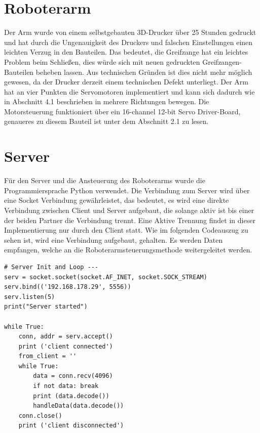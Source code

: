 \documentclass[12pt,					%
							 oneside,			%
							 a4paper,			%
							 halfparskip,		%
							 liststotoc,			%
							 bibtotoc,			%
							 fleqn,				%
							 pointlessnumbers]	%
							 {scrreprt}
\begin{document}
\section{Roboterarm}
Der Arm wurde von einem selbstgebauten 3D-Drucker über 25 Stunden gedruckt und hat durch die Ungenauigkeit des Druckers und falschen Einstellungen einen leichten Verzug in den Bauteilen. Das bedeutet, die Greifzange hat ein leichtes Problem beim Schließen, dies würde sich mit neuen gedruckten Greifzangen-Bauteilen beheben lassen. Aus technischen Gründen ist dies nicht mehr möglich gewesen, da der Drucker derzeit einem technischen Defekt unterliegt.
Der Arm hat an vier Punkten die Servomotoren implementiert und kann sich dadurch wie in Abschnitt 4.1 beschrieben in mehrere Richtungen bewegen. Die Motorsteuerung funktioniert über ein 16-channel 12-bit Servo Driver-Board, genaueres zu diesem Bauteil ist unter dem Abschnitt 2.1 zu lesen.
\newpage
\section{Server}
Für den Server und die Ansteuerung des Roboterarms wurde die Programmiersprache Python verwendet. Die Verbindung zum Server wird über eine Socket Verbindung gewährleistet, das bedeutet, es wird eine direkte Verbindung zwischen Client und Server aufgebaut, die solange aktiv ist bis einer der beiden Partner die Verbindung trennt. Eine Aktive Trennung findet in dieser Implementierung nur durch den Client statt. Wie im folgenden Codeauszug zu sehen ist, wird eine Verbindung aufgebaut, gehalten. Es werden Daten empfangen, welche an die Roboterarmsteuerungsmethode weitergeleitet werden.
\begin{lstlisting}
# Server Init and Loop ---
serv = socket.socket(socket.AF_INET, socket.SOCK_STREAM)
serv.bind(('192.168.178.29', 5556))
serv.listen(5)
print("Server started")

while True:
    conn, addr = serv.accept()
    print ('client connected')
    from_client = ''
    while True:
        data = conn.recv(4096)
        if not data: break
        print (data.decode())
        handleData(data.decode())
    conn.close()
    print ('client disconnected')
\end{lstlisting}
\end{document}
